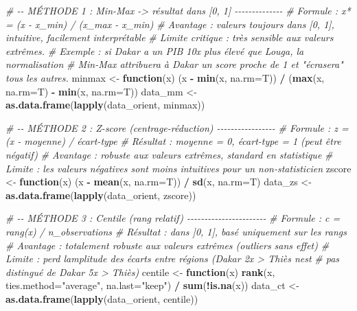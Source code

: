 \documentclass[
]{article}
\newenvironment{Shaded}{\begin{snugshade}}{\end{snugshade}}
\newcommand{\AttributeTok}[1]{\textcolor[rgb]{0.13,0.29,0.53}{#1}}
\newcommand{\CommentTok}[1]{\textcolor[rgb]{0.56,0.35,0.01}{\textit{#1}}}
\newcommand{\ControlFlowTok}[1]{\textcolor[rgb]{0.13,0.29,0.53}{\textbf{#1}}}
\newcommand{\FunctionTok}[1]{\textcolor[rgb]{0.13,0.29,0.53}{\textbf{#1}}}
\newcommand{\NormalTok}[1]{#1}
\newcommand{\OtherTok}[1]{\textcolor[rgb]{0.56,0.35,0.01}{#1}}
\newcommand{\SpecialCharTok}[1]{\textcolor[rgb]{0.81,0.36,0.00}{\textbf{#1}}}
\newcommand{\StringTok}[1]{\textcolor[rgb]{0.31,0.60,0.02}{#1}}
\begin{document}
\begin{Shaded}
\begin{Highlighting}[]
\CommentTok{\# {-}{-} MÉTHODE 1 : Min{-}Max {-}\textgreater{} résultat dans [0, 1] {-}{-}{-}{-}{-}{-}{-}{-}{-}{-}{-}{-}{-}{-}}
\CommentTok{\# Formule : x* = (x {-} x\_min) / (x\_max {-} x\_min)}
\CommentTok{\# Avantage : valeurs toujours dans [0, 1], intuitive, facilement interprétable}
\CommentTok{\# Limite critique : très sensible aux valeurs extrêmes.}
\CommentTok{\#   Exemple : si Dakar a un PIB 10x plus élevé que Louga, la normalisation}
\CommentTok{\#   Min{-}Max attribuera à Dakar un score proche de 1 et "écrasera" tous les autres.}
\NormalTok{minmax }\OtherTok{\textless{}{-}} \ControlFlowTok{function}\NormalTok{(x) (x }\SpecialCharTok{{-}} \FunctionTok{min}\NormalTok{(x, }\AttributeTok{na.rm=}\NormalTok{T)) }\SpecialCharTok{/}\NormalTok{ (}\FunctionTok{max}\NormalTok{(x, }\AttributeTok{na.rm=}\NormalTok{T) }\SpecialCharTok{{-}} \FunctionTok{min}\NormalTok{(x, }\AttributeTok{na.rm=}\NormalTok{T))}
\NormalTok{data\_mm }\OtherTok{\textless{}{-}} \FunctionTok{as.data.frame}\NormalTok{(}\FunctionTok{lapply}\NormalTok{(data\_orient, minmax))}

\CommentTok{\# {-}{-} MÉTHODE 2 : Z{-}score (centrage{-}réduction) {-}{-}{-}{-}{-}{-}{-}{-}{-}{-}{-}{-}{-}{-}{-}{-}{-}}
\CommentTok{\# Formule : z = (x {-} moyenne) / écart{-}type}
\CommentTok{\# Résultat : moyenne = 0, écart{-}type = 1 (peut être négatif)}
\CommentTok{\# Avantage : robuste aux valeurs extrêmes, standard en statistique}
\CommentTok{\# Limite : les valeurs négatives sont moins intuitives pour un non{-}statisticien}
\NormalTok{zscore }\OtherTok{\textless{}{-}} \ControlFlowTok{function}\NormalTok{(x) (x }\SpecialCharTok{{-}} \FunctionTok{mean}\NormalTok{(x, }\AttributeTok{na.rm=}\NormalTok{T)) }\SpecialCharTok{/} \FunctionTok{sd}\NormalTok{(x, }\AttributeTok{na.rm=}\NormalTok{T)}
\NormalTok{data\_zs }\OtherTok{\textless{}{-}} \FunctionTok{as.data.frame}\NormalTok{(}\FunctionTok{lapply}\NormalTok{(data\_orient, zscore))}

\CommentTok{\# {-}{-} MÉTHODE 3 : Centile (rang relatif) {-}{-}{-}{-}{-}{-}{-}{-}{-}{-}{-}{-}{-}{-}{-}{-}{-}{-}{-}{-}{-}{-}{-}}
\CommentTok{\# Formule : c = rang(x) / n\_observations}
\CommentTok{\# Résultat : dans ]0, 1], basé uniquement sur les rangs}
\CommentTok{\# Avantage : totalement robuste aux valeurs extrêmes (outliers sans effet)}
\CommentTok{\# Limite : perd l\textquotesingle{}amplitude des écarts entre régions (Dakar 2x \textgreater{} Thiès n\textquotesingle{}est}
\CommentTok{\#          pas distingué de Dakar 5x \textgreater{} Thiès)}
\NormalTok{centile }\OtherTok{\textless{}{-}} \ControlFlowTok{function}\NormalTok{(x) }\FunctionTok{rank}\NormalTok{(x, }\AttributeTok{ties.method=}\StringTok{"average"}\NormalTok{, }\AttributeTok{na.last=}\StringTok{"keep"}\NormalTok{) }\SpecialCharTok{/} \FunctionTok{sum}\NormalTok{(}\SpecialCharTok{!}\FunctionTok{is.na}\NormalTok{(x))}
\NormalTok{data\_ct }\OtherTok{\textless{}{-}} \FunctionTok{as.data.frame}\NormalTok{(}\FunctionTok{lapply}\NormalTok{(data\_orient, centile))}


\end{Highlighting}
\end{Shaded}
\end{document}
